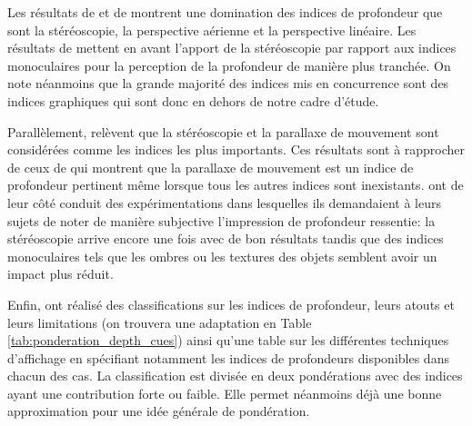 \par Les résultats de \cite{mazur_relative_1990} et de \cite{surdick_relevant_1994} montrent une domination des indices de profondeur que sont la stéréoscopie, la perspective aérienne et la perspective linéaire. Les résultats de \cite{reinhart_comparison_1990} mettent en avant l'apport de la stéréoscopie par rapport aux indices monoculaires pour la perception de la profondeur de manière plus tranchée. On note néanmoins que la grande majorité des indices mis en concurrence sont des indices graphiques qui sont donc en dehors de notre cadre d'étude.

\par Parallèlement, \citep{mikkola_relative_2010} relèvent que la stéréoscopie et la parallaxe de mouvement sont considérées comme les indices les plus importants. Ces résultats sont à rapprocher de ceux de \citep{rogers_motion_1979} qui montrent que la parallaxe de mouvement est un indice de profondeur pertinent même lorsque tous les autres indices sont inexistants. \cite{mikkola_relative_2010} ont de leur côté conduit des expérimentations dans lesquelles ils demandaient à leurs sujets de noter de manière subjective l'impression de profondeur ressentie: la stéréoscopie arrive encore une fois avec de bon résultats tandis que des indices monoculaires tels que les ombres ou les textures des objets semblent avoir un impact plus réduit. 

\par Enfin, \citep{mehrabi_making_2013} ont réalisé des classifications sur les indices de profondeur, leurs atouts et leurs limitations (on trouvera une adaptation en Table \ref{tab:ponderation_depth_cues}) ainsi qu'une table sur les différentes techniques d'affichage en spécifiant notamment les indices de profondeurs disponibles dans chacun des cas. La classification est divisée en deux pondérations avec des indices ayant une contribution forte ou faible. Elle permet néanmoins déjà une bonne approximation pour une idée générale de pondération.

